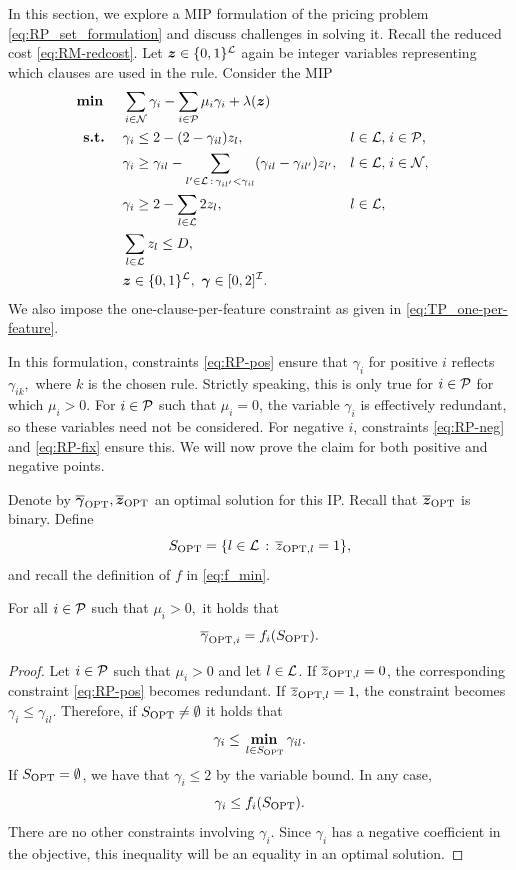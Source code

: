 In this section, we explore a MIP formulation of the pricing problem \eqref{eq:RP_set_formulation} and discuss challenges in solving it.
Recall the reduced cost \eqref{eq:RM-redcost}.
Let $\bm{z}\in \{0,1\}^{\L}$ again be integer variables representing which clauses are used in the rule.
Consider the MIP
\begin{subequations}
    \label{eq:RP}
    \begin{align}
        \min \quad & \sum_{i \in \cN} \gamma_i - \sum_{i \in \cP} \mu_i \gamma_i +
        \lambda(\bm{z}) \label{eq:RP-obj} \\
        \st \quad & \gamma_i \leq 2 - (2 - \gamma_{il})z_l, & l \in \L, &\; i \in \cP, \label{eq:RP-pos} \\
        & \gamma_i \geq \gamma_{il} - \sum_{l' \in \L \fw \gamma_{il'} < \gamma_{il}} (\gamma_{il} - \gamma_{il'}) z_{l'} , & l \in \cL, &\; i \in \cN, \label{eq:RP-neg} \\
        & \gamma_i \geq 2 - \sum_{l \in \L} 2z_l, & l \in \L, \label{eq:RP-fix} \\
        & \sum_{l \in \L} z_l \leq D, \label{eq:RP-complex}\\
        & \bm{z}\in \{0,1\}^{\L},~ \bm{\gamma}\in [0,2]^\I.\label{eq:RP-vars}\qquad
    \end{align}
\end{subequations}
We also impose the one-clause-per-feature constraint as given in \eqref{eq:TP_one-per-feature}.

In this formulation, constraints \eqref{eq:RP-pos} ensure that $\gamma_i$ for positive $i$ reflects $\gamma_{ik},$
where $k$ is the chosen rule.
Strictly speaking, this is only true for $i \in \P$ for which $\mu_i > 0$.
For $i \in \P$ such that $\mu_i = 0$, the variable $\gamma_i$ is effectively redundant,
so these variables need not be considered.
For negative $i$, constraints \eqref{eq:RP-neg} and \eqref{eq:RP-fix} ensure this.
We will now prove the claim for both positive and negative points.

Denote by $\gopt, \zopt$ an optimal solution for this IP\@.
Recall that $\zopt$ is binary.
Define
\[\sopt = \{l \in \L \fw \zopt[l] = 1\},\]
and recall the definition of $f$ in \eqref{eq:f_min}.

\begin{claim}\label{claim:TP_ramp-consP}
    For all $i \in \P$ such that $\mu_i > 0,$ it holds that
    \[\gopt[i] = f_i(\sopt).\]
\end{claim}

\begin{proof}
    Let $i \in \P$ such that $\mu_i > 0$ and let $l \in \L$.
    If $\zopt[l] = 0$, the corresponding constraint \eqref{eq:RP-pos} becomes redundant.
    If $\zopt[l] = 1,$ the constraint becomes $\gamma_i \leq \gamma_{il}.$
    Therefore, if $\sopt \neq \emptyset$ it holds that
    \[\gamma_i \leq \umin{l \in \sopt} \gamma_{il}.\]
    If $\sopt = \emptyset$, we have that $\gamma_i \leq 2$ by the variable bound.
    In any case,
    \[
        \gamma_i \leq f_i(\sopt).
    \]
    There are no other constraints involving $\gamma_i$.
    Since $\gamma_i$ has a negative coefficient in the objective, this inequality will be an equality in an optimal solution.
    \qedhere
\end{proof}

